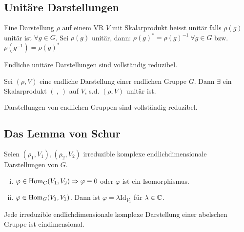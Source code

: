 \subsection{Unitäre Darstellungen}

\begin{definition}
    Eine Darstellung $\rho$ auf einem VR $V$ mit Skalarprodukt heisst
    unitär falls $\rho(g)$ unitär ist $\forall g \in G$.
    Sei $\rho(g)$ unitär, dann: $\rho(g)^\ast = \rho(g)^{-1} \ \forall g \in G$
    bzw. $\rho(g^{-1}) = \rho(g)^\ast$
\end{definition}

\begin{satz}
    Endliche unitäre Darstellungen sind vollständig reduzibel.
\end{satz}

\begin{satz}
    Sei $(\rho,V)$ eine endliche Darstellung einer endlichen Gruppe $G$.
    Dann $\exists$ ein Skalarprodukt $( \ , \ )$ auf $V$, s.d. $(\rho,V)$
    unitär ist.
\end{satz}

\begin{korollar}
    Darstellungen von endlichen Gruppen sind vollständig reduzibel.
\end{korollar}

\subsection{Das Lemma von Schur}

\begin{satz}
    Seien $(\rho_1,V_1),(\rho_2,V_2)$ irreduzible komplexe endlichdimensionale
    Darstellungen von $G$.
    \begin{enumerate}[(i)]
        \item $\varphi \in \text{Hom}_G(V_1,V_2) \Rightarrow \varphi \equiv 0$ oder
            $\varphi$ ist ein Isomorphismus.
        \item $\varphi \in \text{Hom}_G (V_1,V_1)$. Dann ist $\varphi = \lambda \text{Id}_{V_1}$
            für $\lambda \in \mathbb{C}$.
    \end{enumerate}
\end{satz}

\begin{korollar}
    Jede irreduzible endlichdimensionale komplexe Darstellung einer abelschen
    Gruppe ist eindimensional.
\end{korollar}
